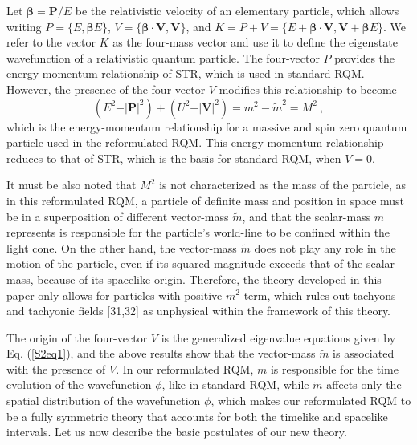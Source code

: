 \documentclass[12pt]{iopart}
\begin{document}
Let $\boldsymbol{\beta}=\boldsymbol{P}/E$ be the relativistic velocity of 
an elementary particle, which allows writing $P =\{E,\boldsymbol{\beta}E\}$, 
$V = \{\boldsymbol{\beta}\cdot\boldsymbol{V},\boldsymbol{V}\}$, and
$K=P+V=\{E+\boldsymbol{\beta}\cdot\boldsymbol{V},\boldsymbol{V}+
\boldsymbol{\beta}E\}$.  We refer to the vector $K$ as the four-mass vector
and use it to define the eigenstate wavefunction of a relativistic quantum 
particle.  The four-vector $P$ provides the energy-momentum relationship 
of STR, which is used in standard RQM.  However, the presence of the 
four-vector $V$ modifies this relationship to become
%
    \begin{equation}
        \left(E^2-\vert\boldsymbol{P}\vert^2\right)+\left(U^2-\vert\boldsymbol{V}
        \vert^2\right) = m^2-\tilde{m}^2=M^2\ ,
        \label{S2eq4}
    \end{equation}
%
which is the energy-momentum relationship for a massive and spin zero quantum 
particle used in the reformulated RQM.  This energy-momentum relationship 
reduces to that of STR, which is the basis for standard RQM, when $V = 0$.

It must be also noted that $M^2$ is not characterized as the mass of the particle, 
as in this reformulated RQM, a particle of definite mass and position in space must 
be in a superposition of different vector-mass $\tilde{m}$, and that the 
scalar-mass $m$ represents is responsible for the particle's world-line to be 
confined within the light cone.  On the other hand, the vector-mass 
$\tilde{m}$ does not play any role in the motion of the particle, even 
if its squared magnitude exceeds that of the scalar-mass, because of its spacelike 
origin.  Therefore, the theory developed in this paper only allows for particles with 
positive $m^2$ term, which rules out tachyons and tachyonic fields [31,32] as 
unphysical within the framework of this theory.

The origin of the four-vector $V$ is the generalized eigenvalue equations given by
Eq. (\ref{S2eq1}), and the above results show that the vector-mass $\tilde m$ is
associated with the presence of $V$.  In our reformulated RQM, $m$ is responsible
for the time evolution of the wavefunction $\phi$, like in standard RQM, while 
$\tilde m$ affects only the spatial distribution of the wavefunction $\phi$, which 
makes our reformulated RQM to be a fully symmetric theory that accounts for both 
the timelike and spacelike intervals.  Let us now describe the basic postulates of 
our new theory.  
% 
\end{document}
